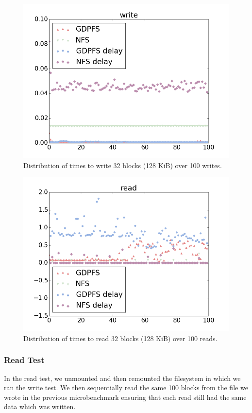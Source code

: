 \documentclass{acm_proc_article-sp}
\begin{document}
\begin{figure}[t]
\centering
\includegraphics[width=.8\columnwidth]{write-open-close}
\caption{Distribution of times to write 32 blocks (128 KiB) over 100 writes.\label{fig:write}}
\end{figure} 

\begin{figure}[t]
\centering
\includegraphics[width=.8\columnwidth]{read}
\caption{Distribution of times to read 32 blocks (128 KiB) over 100 reads.\label{fig:read}}
\end{figure} 

\subsubsection{Read Test}
In the read test, we unmounted and then remounted the filesystem in which we ran the write test. We then sequentially read the same 100 blocks from the file we wrote in the previous microbenchmark ensuring that each read still had the same data which was written.
\end{document}
